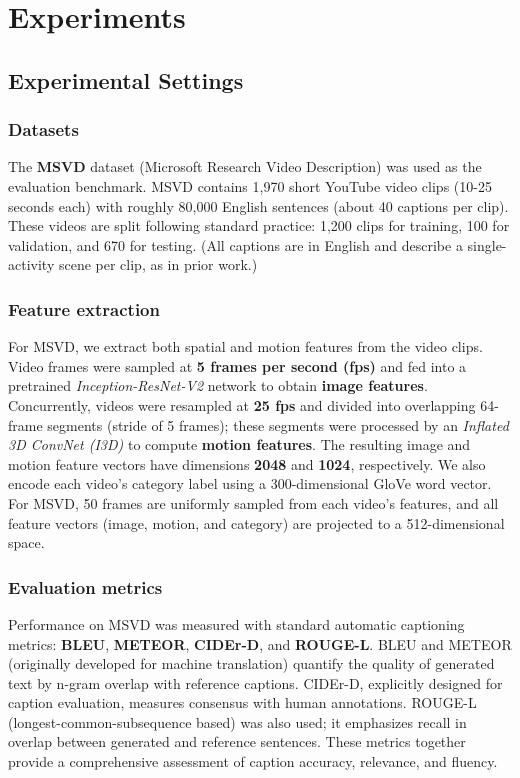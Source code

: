 \section{Experiments}

\subsection{Experimental Settings}

\subsubsection{Datasets}

The \textbf{MSVD} dataset (Microsoft Research Video Description) was used as the evaluation benchmark. MSVD contains 1,970 short YouTube video clips (10-25 seconds each) with roughly 80,000 English sentences (about 40 captions per clip). These videos are split following standard practice: 1,200 clips for training, 100 for validation, and 670 for testing. (All captions are in English and describe a single-activity scene per clip, as in prior work.)

\subsubsection{Feature extraction}

For MSVD, we extract both spatial and motion features from the video clips. Video frames were sampled at \textbf{5 frames per second (fps)} and fed into a pretrained \textit{Inception-ResNet-V2} network to obtain \textbf{image features}. Concurrently, videos were resampled at \textbf{25 fps} and divided into overlapping 64-frame segments (stride of 5 frames); these segments were processed by an \textit{Inflated 3D ConvNet (I3D)} to compute \textbf{motion features}. The resulting image and motion feature vectors have dimensions \textbf{2048} and \textbf{1024}, respectively. We also encode each video's category label using a 300-dimensional GloVe word vector. For MSVD, 50 frames are uniformly sampled from each video's features, and all feature vectors (image, motion, and category) are projected to a 512-dimensional space.

\subsubsection{Evaluation metrics}

Performance on MSVD was measured with standard automatic captioning metrics: \textbf{BLEU}, \textbf{METEOR}, \textbf{CIDEr-D}, and \textbf{ROUGE-L}. BLEU and METEOR (originally developed for machine translation) quantify the quality of generated text by n-gram overlap with reference captions. CIDEr-D, explicitly designed for caption evaluation, measures consensus with human annotations. ROUGE-L (longest-common-subsequence based) was also used; it emphasizes recall in overlap between generated and reference sentences. These metrics together provide a comprehensive assessment of caption accuracy, relevance, and fluency.

